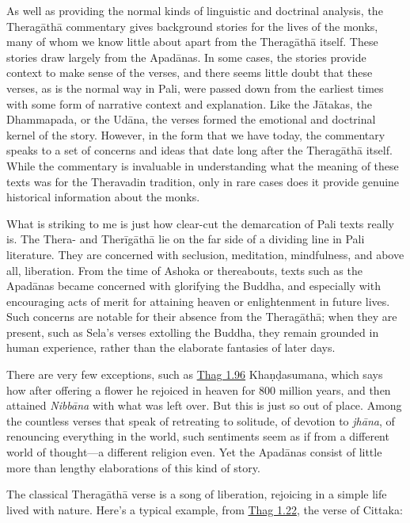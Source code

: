 \documentclass[12pt,openany]{book}%
\begin{document}
As well as providing the normal kinds of linguistic and doctrinal analysis, the \textsanskrit{Theragāthā} commentary gives background stories for the lives of the monks, many of whom we know little about apart from the \textsanskrit{Theragāthā} itself. These stories draw largely from the \textsanskrit{Apadānas}. In some cases, the stories provide context to make sense of the verses, and there seems little doubt that these verses, as is the normal way in Pali, were passed down from the earliest times with some form of narrative context and explanation. Like the \textsanskrit{Jātakas}, the Dhammapada, or the \textsanskrit{Udāna}, the verses formed the emotional and doctrinal kernel of the story. However, in the form that we have today, the commentary speaks to a set of concerns and ideas that date long after the \textsanskrit{Theragāthā} itself. While the commentary is invaluable in understanding what the meaning of these texts was for the Theravadin tradition, only in rare cases does it provide genuine historical information about the monks.

What is striking to me is just how clear-cut the demarcation of Pali texts really is. The Thera- and \textsanskrit{Therīgāthā} lie on the far side of a dividing line in Pali literature. They are concerned with seclusion, meditation, mindfulness, and above all, liberation. From the time of Ashoka or thereabouts, texts such as the \textsanskrit{Apadānas} became concerned with glorifying the Buddha, and especially with encouraging acts of merit for attaining heaven or enlightenment in future lives. Such concerns are notable for their absence from the \textsanskrit{Theragāthā}; when they are present, such as Sela’s verses extolling the Buddha, they remain grounded in human experience, rather than the elaborate fantasies of later days.

There are very few exceptions, such as \href{https://suttacentral.net/thag1.96}{Thag 1.96} \textsanskrit{Khaṇḍasumana}, which says how after offering a flower he rejoiced in heaven for 800 million years, and then attained \textit{\textsanskrit{Nibbāna}} with what was left over. But this is just so out of place. Among the countless verses that speak of retreating to solitude, of devotion to \textit{\textsanskrit{jhāna}}, of renouncing everything in the world, such sentiments seem as if from a different world of thought—a different religion even. Yet the \textsanskrit{Apadānas} consist of little more than lengthy elaborations of this kind of story.

The classical \textsanskrit{Theragāthā} verse is a song of liberation, rejoicing in a simple life lived with nature. Here’s a typical example, from \href{https://suttacentral.net/thag1.22}{Thag 1.22}, the verse of Cittaka:
\end{document}
